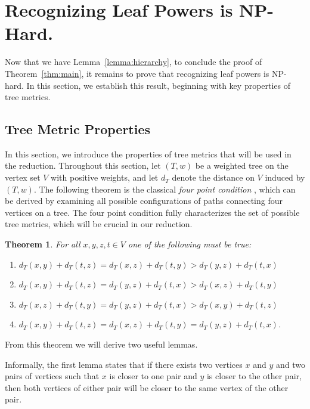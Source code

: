 \documentclass[11pt, letter]{article}
\newtheorem{theorem}{Theorem}[section]
\theoremstyle{remark}
\begin{document}
\section{Recognizing Leaf Powers is NP-Hard.}

Now that we have Lemma~\ref{lemma:hierarchy}, to conclude the proof of Theorem~\ref{thm:main}, it remains to prove that recognizing leaf powers is NP-hard. In this section, we establish this result, beginning with key properties of tree metrics.



\subsection{Tree Metric Properties}\label{sec:Tree Metric}

In this section, we introduce the properties of tree metrics that will be used in the reduction. Throughout this section, let $(T,w)$ be a weighted tree on the vertex set $V$ with positive weights, and let $d_T$ denote the distance on $V$ induced by $(T,w)$. The following theorem is the classical \emph{four point condition} \cite{BUNEMAN197448}, which can be derived by examining all possible configurations of paths connecting four vertices on a tree. The four point condition fully characterizes the set of possible tree metrics, which will be crucial in our reduction.

\begin{theorem}\cite{BUNEMAN197448} \label{thm:4PC}
For all $ x,y,z,t\in V$ one of the following must be true:
    \begin{enumerate}
        \item $d_T(x,y)+d_T(t,z)=d_T(x,z)+d_T(t,y)>d_T(y,z)+d_T(t,x)$
        \item $d_T(x,y)+d_T(t,z)=d_T(y,z)+d_T(t,x)>d_T(x,z)+d_T(t,y)$
        \item $d_T(x,z)+d_T(t,y)=d_T(y,z)+d_T(t,x)>d_T(x,y)+d_T(t,z)$ 
        \item $d_T(x,y)+d_T(t,z)=d_T(x,z)+d_T(t,y)=d_T(y,z)+d_T(t,x)$.
    \end{enumerate}
\end{theorem}

From this theorem we will derive two useful lemmas. 

Informally, the first lemma states that if there exists two vertices $x$ and $y$ and two pairs of vertices such that $x$ is closer to one pair and $y$ is closer to the other pair, then both vertices of either pair will be closer to the same vertex of the other pair.
\end{document}
